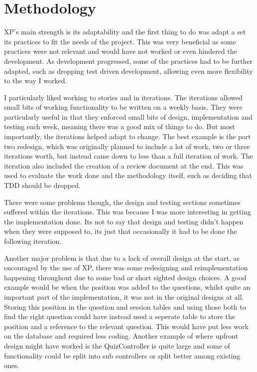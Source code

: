 \section{Methodology}
XP's main strength is its adaptability and the first thing to do was adapt a set its practices to fit the needs of the project. This was very beneficial as some practices were not relevant and would have not worked or even hindered the development. As development progressed, some of the practices had to be further adapted, such as dropping test driven development, allowing even more flexibility to the way I worked.

I particularly liked working to stories and in iterations. The iterations allowed small bits of working functionality to be written on a weekly basis. They were particularly useful in that they enforced small bits of design, implementation and testing each week, meaning there was a good mix of things to do. But most importantly, the iterations helped adapt to change. The best example is the part two redesign, which was originally planned to include a lot of work, two or three iterations worth, but instead came down to less than a full iteration of work. The iteration also included the creation of a review document at the end. This was used to evaluate the work done and the methodology itself, such as deciding that TDD should be dropped.

There were some problems though, the design and testing sections sometimes suffered within the iterations. This was because I was more interesting in getting the implementation done. Its not to say that design and testing didn't happen when they were supposed to, its just that occasionally it had to be done the following iteration.

Another major problem is that due to a lack of overall design at the start, as encouraged by the use of XP, there was some redesigning and reimplementation happening throughout due to some bad or short sighted design choices. A good example would be when the position was added to the questions, whilst quite an important part of the implementation, it was not in the original designs at all. Storing this position in the question and session tables and using those both to find the right question could have instead used a seperate table to store the position and a reference to the relevant question. This would have put less work on the database and required less coding. Another example of where upfront design might have worked is the QuizController is quite large and some of functionality could be split into sub controllers or split better among existing ones.

